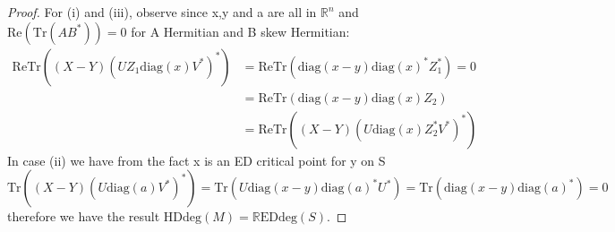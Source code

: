 \documentclass[11pt]{amsart}
\theoremstyle{plain}
\theoremstyle{definition}
\theoremstyle{remark}
\begin{document}
\begin{proof}
For (i) and (iii), observe since x,y and a are all in $\mathbb{R}^n$ and $\mathrm{Re}(\mathrm{Tr}(AB^*))=0$ for A Hermitian and B skew Hermitian:
\begin{equation}
\begin{aligned}
\mathrm{Re} \mathrm{Tr}\!\left( (X - Y)(U Z_1 \mathrm{diag}(x) V^*)^* \right)
&= \mathrm{Re} \mathrm{Tr}\!\left( \mathrm{diag}(x - y)\mathrm{diag}({x})^* Z_1^* \right) = 0 \\
&= \mathrm{Re} \mathrm{Tr}\!\left(\mathrm{diag}(x - y)\mathrm{diag}(x)Z_2 \right) \\
&= \mathrm{Re} \mathrm{Tr}\!\left( (X - Y)(U \mathrm{diag}(x)Z_2^* V^*)^* \right)
\end{aligned}
\label{comp}
\end{equation}
In case (ii) we have from the fact x is an ED critical point for y on S $$
\mathrm{Tr}\left((X - Y)(U \mathrm{diag}(a) V^*)^*\right)=\mathrm{Tr}(U\mathrm{diag}(x-y)\mathrm{diag}(a)^*U^*)
= \mathrm{Tr}\left(\mathrm{diag}(x - y) \mathrm{diag}(a)^*\right) = 0
$$
therefore we have the result $\mathrm{HDdeg}(M) = \mathrm{\mathbb{R}EDdeg}(S).$
 
\end{proof}
\end{document}

